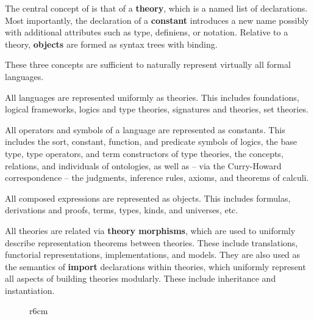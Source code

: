 The central concept of \mmt is that of a \textbf{theory}, which is a named list of declarations.
Most importantly, the declaration of a \textbf{constant} introduces a new name possibly with additional attributes such as type, definiens, or notation.
Relative to a theory, \textbf{objects} are formed as syntax trees with binding.

These three concepts are sufficient to naturally represent virtually all formal languages.
\begin{compactitem}
\item All languages are represented uniformly as {\mmt} theories.
This includes foundations, logical frameworks, logics and type theories, signatures and theories, set theories.
\item All operators and symbols of a language are represented as \mmt constants.
This includes the sort, constant, function, and predicate symbols of logics, the base type, type operators, and term constructors of type theories, the concepts, relations, and individuals of ontologies, as well as -- via the Curry-Howard correspondence -- the judgments, inference rules, axioms, and theorems of calculi.
\item All composed expressions are represented as objects.
This includes formulas, derivations and proofs, terms, types, kinds, and universes, etc.
\end{compactitem}

All {\mmt} theories are related via \textbf{theory morphisms}, which are used to uniformly describe representation theorems between theories.
These include translations, functorial representations, implementations, and models.
They are also used as the semantics of \textbf{import} declarations within theories, which uniformly represent all aspects of building theories modularly.
These include inheritance and instantiation.

\begin{figure}r{6cm}
\vspace{-1em}
\end{figure}

